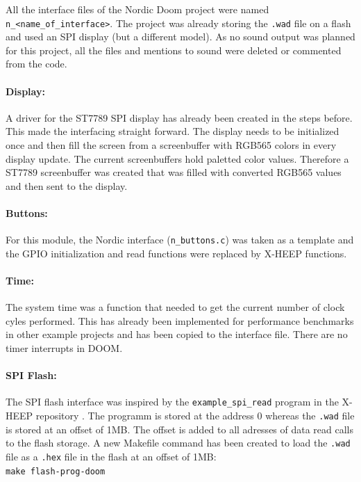 All the interface files of the Nordic Doom project were named \texttt{n\_<name\_of\_interface>}. The project was already storing the \texttt{.wad} file on a flash and used an SPI display (but a different model). As no sound output was planned for this project, all the files and mentions to sound were deleted or commented from the code. \\

\paragraph{Display:} A driver for the ST7789 SPI display has already been created in the steps before. This made the interfacing straight forward. The display needs to be initialized once and then fill the screen from a screenbuffer with RGB565 colors in every display update. The current screenbuffers hold paletted color values. Therefore a ST7789 screenbuffer was created that was filled with converted RGB565 values and then sent to the display. \\

\paragraph{Buttons:} For this module, the Nordic interface (\texttt{n\_buttons.c}) was taken as a template and the GPIO initialization and read functions were replaced by X-HEEP functions. \\

\paragraph{Time:} The system time was a function that needed to get the current number of clock cyles performed. This has already been implemented for performance benchmarks in other example projects and has been copied to the interface file. There are no timer interrupts in DOOM.


\paragraph{SPI Flash:} The SPI flash interface was inspired by the \texttt{example\_spi\_read} program in the X-HEEP repository \cite{xHeepRepo}. The programm is stored at the address 0 whereas the \texttt{.wad} file is stored at an offset of 1MB. The offset is added to all adresses of data read calls to the flash storage. A new Makefile command has been created to load the \texttt{.wad} file as a \texttt{.hex} file in the flash at an offset of 1MB: \\
\texttt{make flash-prog-doom} \\


